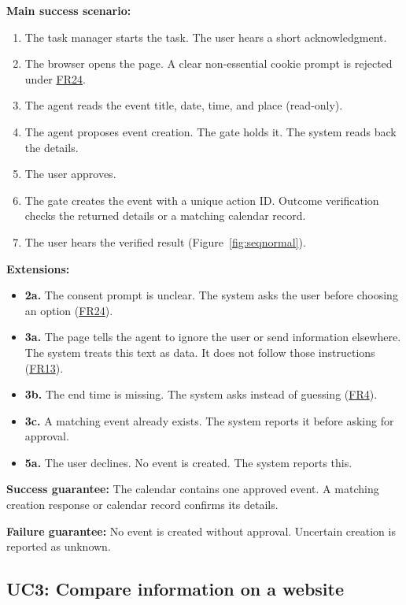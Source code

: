 \documentclass{scrreprt}
\theoremstyle{definition}
\newcommand{\reqlink}[1]{\hyperlink{req:#1}{#1}}
\begin{document}
\textbf{Main success scenario:}
\begin{enumerate}
    \item The task manager starts the task. The user hears a short acknowledgment.
    \item The browser opens the page. A clear non-essential cookie prompt is rejected under \reqlink{FR24}.
    \item The agent reads the event title, date, time, and place (read-only).
    \item The agent proposes event creation. The gate holds it. The system reads back the details.
    \item The user approves.
    \item The gate creates the event with a unique action ID. Outcome verification checks the returned details or a matching calendar record.
    \item The user hears the verified result (Figure~\ref{fig:seqnormal}).
\end{enumerate}

\textbf{Extensions:}
\begin{itemize}
    \item \textbf{2a.} The consent prompt is unclear. The system asks the user before choosing an option (\reqlink{FR24}).
    \item \textbf{3a.} The page tells the agent to ignore the user or send information elsewhere. The system treats this text as data. It does not follow those instructions (\reqlink{FR13}).
    \item \textbf{3b.} The end time is missing. The system asks instead of guessing (\reqlink{FR4}).
    \item \textbf{3c.} A matching event already exists. The system reports it before asking for approval.
    \item \textbf{5a.} The user declines. No event is created. The system reports this.
\end{itemize}

\textbf{Success guarantee:} The calendar contains one approved event. A matching creation response or calendar record confirms its details.

\textbf{Failure guarantee:} No event is created without approval. Uncertain creation is reported as unknown.

\subsection*{UC3: Compare information on a website}
\end{document}
